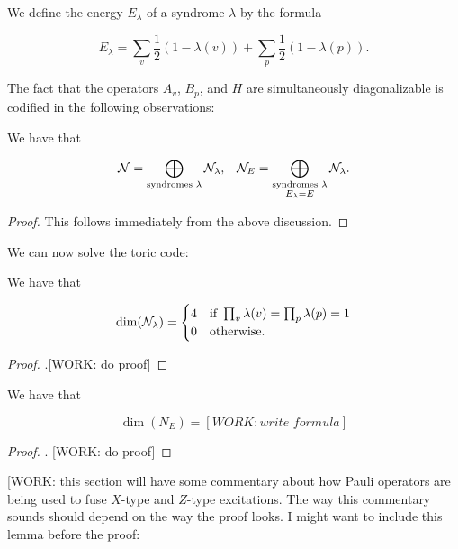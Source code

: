 We define the energy $E_{\lambda}$ of a syndrome $\lambda$ by the formula

$$E_{\lambda}=\sum_{v}\frac{1}{2}(1-\lambda(v))+\sum_{p}\frac{1}{2}(1-\lambda(p)).$$

The fact that the operators $A_v$, $B_p$, and $H$ are simultaneously diagonalizable is codified in the following observations:

\begin{proposition} We have that

\begin{align*}
\mathcal{N} = \bigoplus_{\text{syndromes $\lambda$}} \mathcal{N}_{\lambda}, && \mathcal{N}_{E}=\bigoplus_{\substack{\text{syndromes $\lambda$}  \\ E_\lambda = E }  } \mathcal{N}_{\lambda}.
\end{align*}

\end{proposition}
\begin{proof} This follows immediately from the above discussion.
\end{proof}


We can now solve the toric code:

\begin{proposition} We have that

\begin{equation*}
\dim(\mathcal{N}_{\lambda}) = 
\begin{cases}
4 & \text{if }\prod_{v}\lambda(v) = \prod_{p}\lambda(p) = 1\\
0 & \text{otherwise.}
\end{cases}
\end{equation*}

\end{proposition}
\begin{proof}.[WORK: do proof]
\end{proof}

\begin{corollary} We have that

$$\dim (N_{E})=[WORK: write\,\, formula]$$
\end{corollary}
\begin{proof} . [WORK: do proof]
\end{proof}

[WORK: this section will have some commentary about how Pauli operators are being used to fuse $X$-type and $Z$-type excitations. The way this commentary sounds should depend on the way the proof looks. I might want to include this lemma before the proof:

